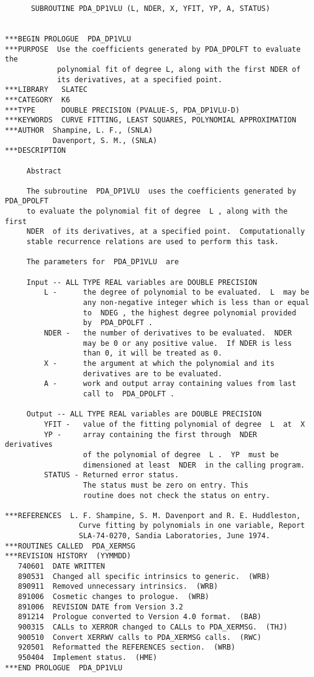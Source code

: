 \begin{verbatim}
      SUBROUTINE PDA_DP1VLU (L, NDER, X, YFIT, YP, A, STATUS)


***BEGIN PROLOGUE  PDA_DP1VLU
***PURPOSE  Use the coefficients generated by PDA_DPOLFT to evaluate the
            polynomial fit of degree L, along with the first NDER of
            its derivatives, at a specified point.
***LIBRARY   SLATEC
***CATEGORY  K6
***TYPE      DOUBLE PRECISION (PVALUE-S, PDA_DP1VLU-D)
***KEYWORDS  CURVE FITTING, LEAST SQUARES, POLYNOMIAL APPROXIMATION
***AUTHOR  Shampine, L. F., (SNLA)
           Davenport, S. M., (SNLA)
***DESCRIPTION

     Abstract

     The subroutine  PDA_DP1VLU  uses the coefficients generated by  PDA_DPOLFT
     to evaluate the polynomial fit of degree  L , along with the first
     NDER  of its derivatives, at a specified point.  Computationally
     stable recurrence relations are used to perform this task.

     The parameters for  PDA_DP1VLU  are

     Input -- ALL TYPE REAL variables are DOUBLE PRECISION
         L -      the degree of polynomial to be evaluated.  L  may be
                  any non-negative integer which is less than or equal
                  to  NDEG , the highest degree polynomial provided
                  by  PDA_DPOLFT .
         NDER -   the number of derivatives to be evaluated.  NDER
                  may be 0 or any positive value.  If NDER is less
                  than 0, it will be treated as 0.
         X -      the argument at which the polynomial and its
                  derivatives are to be evaluated.
         A -      work and output array containing values from last
                  call to  PDA_DPOLFT .

     Output -- ALL TYPE REAL variables are DOUBLE PRECISION
         YFIT -   value of the fitting polynomial of degree  L  at  X
         YP -     array containing the first through  NDER  derivatives
                  of the polynomial of degree  L .  YP  must be
                  dimensioned at least  NDER  in the calling program.
         STATUS - Returned error status.
                  The status must be zero on entry. This
                  routine does not check the status on entry.

***REFERENCES  L. F. Shampine, S. M. Davenport and R. E. Huddleston,
                 Curve fitting by polynomials in one variable, Report
                 SLA-74-0270, Sandia Laboratories, June 1974.
***ROUTINES CALLED  PDA_XERMSG
***REVISION HISTORY  (YYMMDD)
   740601  DATE WRITTEN
   890531  Changed all specific intrinsics to generic.  (WRB)
   890911  Removed unnecessary intrinsics.  (WRB)
   891006  Cosmetic changes to prologue.  (WRB)
   891006  REVISION DATE from Version 3.2
   891214  Prologue converted to Version 4.0 format.  (BAB)
   900315  CALLs to XERROR changed to CALLs to PDA_XERMSG.  (THJ)
   900510  Convert XERRWV calls to PDA_XERMSG calls.  (RWC)
   920501  Reformatted the REFERENCES section.  (WRB)
   950404  Implement status.  (HME)
***END PROLOGUE  PDA_DP1VLU
\end{verbatim}


